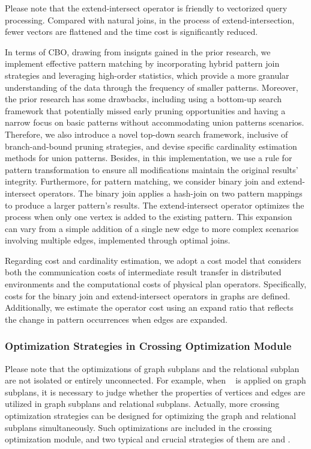 Please note that the extend-intersect operator is friendly to vectorized query processing.
Compared with natural joins, in the process of extend-intersection, fewer vectors are flattened and the time cost is significantly reduced.


In terms of CBO, drawing from insignts gained in the prior research, we implement effective pattern matching by incorporating hybrid pattern join strategies and leveraging high-order statistics, which provide a more granular understanding of the data through the frequency of smaller patterns.
Moreover, the prior research has some drawbacks, including using a bottom-up search framework that potentially missed early pruning opportunities and having a narrow focus on basic patterns without accommodating union patterns scenarios.
Therefore, we also introduce a novel top-down search framework, inclusive of branch-and-bound pruning strategies, and devise specific cardinality estimation methods for union patterns. 
Besides, in this implementation, we use a rule for pattern transformation to ensure all modifications maintain the original results’ integrity.
Furthermore, for pattern matching, we consider binary join and extend-intersect operators. 
The binary join applies a hash-join on two pattern mappings to produce a larger pattern's results.
The extend-intersect operator optimizes the process when only one vertex is added to the existing pattern. 
This expansion can vary from a simple addition of a single new edge to more complex scenarios involving multiple edges, implemented through optimal joins.

Regarding cost and cardinality estimation, we adopt a cost model that considers both the communication costs of intermediate result transfer in distributed environments and the computational costs of physical plan operators. 
Specifically, costs for the binary join and extend-intersect operators in graphs are defined. 
Additionally, we estimate the operator cost using an expand ratio that reflects the change in pattern occurrences when edges are expanded.

\subsubsection{Optimization Strategies in Crossing Optimization Module}

Please note that the optimizations of graph subplans and the relational subplan are not isolated or entirely unconnected.
For example, when \trimrule~ is applied on graph subplans, it is necessary to judge whether the properties of vertices and edges are utilized in graph subplans and relational subplans.
Actually, more crossing optimization strategies can be designed for optimizing the graph and relational subplans simultaneously.
Such optimizations are included in the crossing optimization module, and two typical and crucial strategies of them are \filterrule and \intersectrule. 

